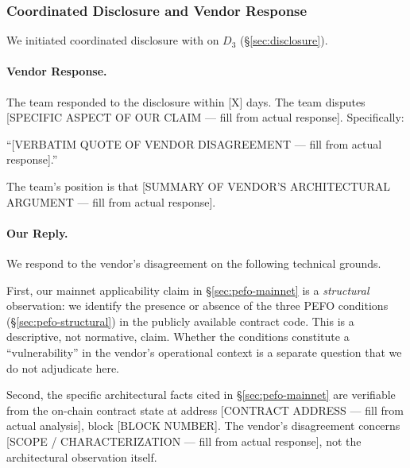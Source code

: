 
\subsubsection{Coordinated Disclosure and Vendor Response}
\label{sec:pefo-disclosure-3c}

We initiated coordinated disclosure with \DEPLOYEDAPP{} on $D_3$
(\S\ref{sec:disclosure}).

\paragraph{Vendor Response.}
The \DEPLOYEDAPP{} team responded to the disclosure within [X] days. The team
disputes [SPECIFIC ASPECT OF OUR CLAIM — fill from actual response]. Specifically:

``[VERBATIM QUOTE OF VENDOR DISAGREEMENT — fill from actual response].''

The team's position is that [SUMMARY OF VENDOR'S ARCHITECTURAL ARGUMENT —
fill from actual response].

\paragraph{Our Reply.}
We respond to the vendor's disagreement on the following technical grounds.

First, our mainnet applicability claim in \S\ref{sec:pefo-mainnet} is a
\emph{structural} observation: we identify the presence or absence of the three
PEFO conditions (\S\ref{sec:pefo-structural}) in the publicly available contract
code. This is a descriptive, not normative, claim. Whether the conditions
constitute a ``vulnerability'' in the vendor's operational context is a separate
question that we do not adjudicate here.

Second, the specific architectural facts cited in \S\ref{sec:pefo-mainnet}
are verifiable from the on-chain contract state at address
[CONTRACT ADDRESS — fill from actual analysis], block [BLOCK NUMBER]. The
vendor's disagreement concerns [SCOPE / CHARACTERIZATION — fill from actual
response], not the architectural observation itself.

